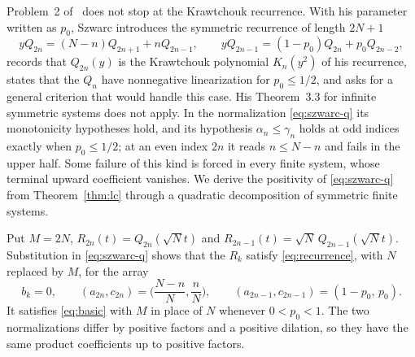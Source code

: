 Problem~2 of~\cite[\S5]{szwarc} does not stop at the Krawtchouk recurrence. With his parameter written as $p_0$, Szwarc introduces the symmetric recurrence of length $2N+1$
\begin{equation}\label{eq:szwarc-q}
yQ_{2n}=(N-n)Q_{2n+1}+nQ_{2n-1},\qquad
yQ_{2n-1}=(1-p_0)Q_{2n}+p_0Q_{2n-2},
\end{equation}
records that $Q_{2n}(y)$ is the Krawtchouk polynomial $K_n(y^2)$ of his recurrence, states that the $Q_n$ have nonnegative linearization for $p_0\leq1/2$, and asks for a general criterion that would handle this case. His Theorem~3.3 for infinite symmetric systems does not apply. In the normalization \eqref{eq:szwarc-q} its monotonicity hypotheses hold, and its hypothesis $\alpha_n\leq\gamma_n$ holds at odd indices exactly when $p_0\leq1/2$; at an even index $2n$ it reads $n\leq N-n$ and fails in the upper half. Some failure of this kind is forced in every finite system, whose terminal upward coefficient vanishes. We derive the positivity of \eqref{eq:szwarc-q} from Theorem~\ref{thm:lc} through a quadratic decomposition of symmetric finite systems.

Put $M=2N$, $R_{2n}(t)=Q_{2n}(\sqrt Nt)$ and $R_{2n-1}(t)=\sqrt N\,Q_{2n-1}(\sqrt Nt)$. Substitution in \eqref{eq:szwarc-q} shows that the $R_k$ satisfy \eqref{eq:recurrence}, with $N$ replaced by $M$, for the array
\begin{equation}\label{eq:qarray}
b_k=0,\qquad
(a_{2n},c_{2n})=\Big(\frac{N-n}{N},\frac nN\Big),\qquad
(a_{2n-1},c_{2n-1})=(1-p_0,\,p_0).
\end{equation}
It satisfies \eqref{eq:basic} with $M$ in place of $N$ whenever $0<p_0<1$. The two normalizations differ by positive factors and a positive dilation, so they have the same product coefficients up to positive factors.


